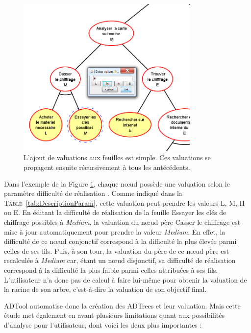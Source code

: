 	\begin{figure}[h]
        \centering
        \includegraphics[width=0.8\textwidth]{figure/adtool_add_values.png}
        \caption{L'ajout de valuations aux feuilles est simple. Ces valuations se propagent ensuite récursivement à tous les antécédents.}
        \label{fig:arbre_exemple_2}
    \end{figure}
	
	Dans l'exemple de la {\sc Figure} \ref{fig:arbre_exemple_2}, chaque nœud possède une valuation selon le paramètre \og difficulté de réalisation \fg{}. Comme indiqué dans la \textsc{Table}~\ref{tab:DescriptionParam}, cette valuation peut prendre les valeurs L, M, H ou E. En éditant la difficulté de réalisation de la feuille \og Essayer les clés de chiffrage possibles \fg{} à \emph{Medium}, la valuation du nœud père \og Casser le chiffrage \fg{} est mise à jour automatiquement pour prendre la valeur \emph{Medium}. En effet, la difficulté de ce nœud conjonctif correspond à la difficulté la plus élevée parmi celles de ses fils. Puis, à son tour, la valuation du père de ce nœud père est recalculée à \emph{Medium} car, étant un nœud disjonctif, sa difficulté de réalisation correspond à la difficulté la plus faible parmi celles attribuées à ses fils. L'utilisateur n'a donc pas de calcul à faire lui-même pour obtenir la valuation de la racine de son arbre, c'est-à-dire la valuation de son objectif final. 

	ADTool automatise donc la création des ADTrees et leur valuation. Mais cette étude met également en avant plusieurs limitations quant aux possibilités d'analyse pour l'utilisateur, dont voici les deux plus importantes :  


